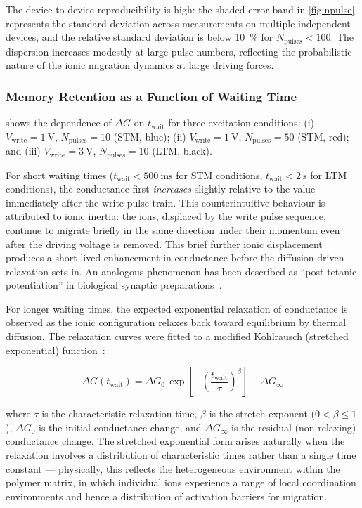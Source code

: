 \documentclass[12pt, a4paper, twoside]{report}
\begin{document}
The device-to-device reproducibility is high: the shaded error band in \cref{fig:npulse} represents the standard deviation across measurements on multiple independent devices, and the relative standard deviation is below \SI{10}{\percent} for $N_{\mathrm{pulses}} < 100$. The dispersion increases modestly at large pulse numbers, reflecting the probabilistic nature of the ionic migration dynamics at large driving forces.

\subsubsection{Memory Retention as a Function of Waiting Time}

 shows the dependence of $\Delta G$ on $t_{\mathrm{wait}}$ for three excitation conditions: (i) $V_{\mathrm{write}} = \SI{1}{\volt}$, $N_{\mathrm{pulses}} = 10$ (STM, blue); (ii) $V_{\mathrm{write}} = \SI{1}{\volt}$, $N_{\mathrm{pulses}} = 50$ (STM, red); and (iii) $V_{\mathrm{write}} = \SI{3}{\volt}$, $N_{\mathrm{pulses}} = 10$ (LTM, black).

For short waiting times ($t_{\mathrm{wait}} < \SI{500}{\milli\second}$ for STM conditions, $t_{\mathrm{wait}} < \SI{2}{\second}$ for LTM conditions), the conductance first \textit{increases} slightly relative to the value immediately after the write pulse train. This counterintuitive behaviour is attributed to ionic inertia: the ions, displaced by the write pulse sequence, continue to migrate briefly in the same direction under their momentum even after the driving voltage is removed. This brief further ionic displacement produces a short-lived enhancement in conductance before the diffusion-driven relaxation sets in. An analogous phenomenon has been described as ``post-tetanic potentiation'' in biological synaptic preparations~\cite{Zucker1989}.

For longer waiting times, the expected exponential relaxation of conductance is observed as the ionic configuration relaxes back toward equilibrium by thermal diffusion. The relaxation curves were fitted to a modified Kohlrausch (stretched exponential) function~\cite{Sturman2003}:

\begin{equation}
  \Delta G(t_{\mathrm{wait}}) = \Delta G_0 \, \exp\!\left[-\left(\frac{t_{\mathrm{wait}}}{\tau}\right)^\beta\right] + \Delta G_\infty
  \label{eq:kohlrausch}
\end{equation}

where $\tau$ is the characteristic relaxation time, $\beta$ is the stretch exponent ($0 < \beta \leq 1$), $\Delta G_0$ is the initial conductance change, and $\Delta G_\infty$ is the residual (non-relaxing) conductance change. The stretched exponential form arises naturally when the relaxation involves a distribution of characteristic times rather than a single time constant — physically, this reflects the heterogeneous environment within the polymer matrix, in which individual ions experience a range of local coordination environments and hence a distribution of activation barriers for migration.
\end{document}
